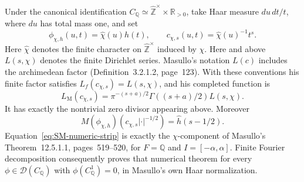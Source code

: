 \documentclass[11pt,a4paper]{article}
\theoremstyle{definition}\newtheorem{definition}[theorem]{Definition}
\theoremstyle{remark}\newtheorem{remark}[theorem]{Remark}
\begin{document}
Under the canonical identification
$C_{\mathbb Q}\simeq\widehat{\mathbb Z}^{\times}\times\mathbb R_{>0}$,
take Haar measure $du\,dt/t$, where $du$ has total mass one, and set
\[
 \phi_{\chi,h}(u,t)=\widehat\chi(u)h(t),\qquad
 c_{\chi,s}(u,t)=\widehat\chi(u)^{-1}t^s.
\]
Here $\widehat\chi$ denotes the finite character on
$\widehat{\mathbb Z}^{\times}$ induced by $\chi$.
Here and above $L(s,\chi)$ denotes the finite Dirichlet series.  Masullo's
notation $L(c)$ includes the archimedean factor (Definition~3.2.1.2,
page~123).  With these conventions his finite factor satisfies
$L_f(c_{\chi,s})=L(s,\chi)$, and his completed function is
\[
 L_{\mathrm M}(c_{\chi,s})=
 \pi^{-(s+a)/2}\Gamma((s+a)/2)L(s,\chi).
\]
It has exactly the nontrivial zero divisor appearing above.  Moreover
\[
 M(\phi_{\chi,h})(c_{\chi,s}|\cdot|^{-1/2})
       =\widehat h(s-1/2).
\]
Equation~\eqref{eq:SM-numeric-strip} is exactly the $\chi$-component of
Masullo's Theorem~12.5.1.1, pages~519--520, for $F=\mathbb Q$ and
$I=[-\alpha,\alpha]$.  Finite Fourier decomposition consequently proves
that numerical theorem for every $\phi\in\mathcal D(C_{\mathbb Q})$
with $\phi(C_{\mathbb Q}^1)=0$, in Masullo's own Haar normalization.
\end{document}
